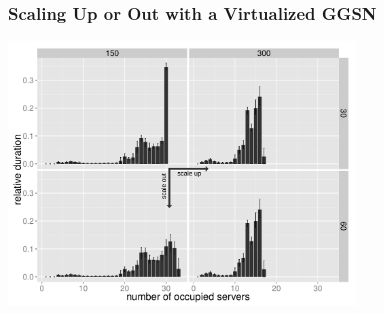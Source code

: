 \documentclass{beamer}
\begin{document}
\begin{frame}
	\frametitle{Scaling Up or Out with a Virtualized GGSN}
	
	\begin{center}
		\includegraphics[height=7cm]{figures/resourceusedistribution-detail-barplot-annotated.pdf}
	\end{center}
\end{frame}
\end{document}
